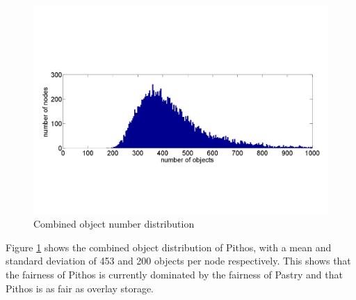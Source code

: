 \documentclass[10pt,a4paper,conference]{IEEEtran}
\begin{document}
\begin{figure}[htbp]
 \centering
 \includegraphics[clip=true, viewport=1cm 5cm 29cm 14.5cm, width=\columnwidth]{Objects}
 \caption{Combined object number distribution}
 \label{fig_objects}
\end{figure}
%
Figure \ref{fig_objects} shows the combined object distribution of Pithos, with a mean and standard deviation of 453 and 200 objects per node
respectively. This shows that the fairness of Pithos is currently dominated by the fairness of Pastry and that Pithos is as fair as overlay storage.
\end{document}
